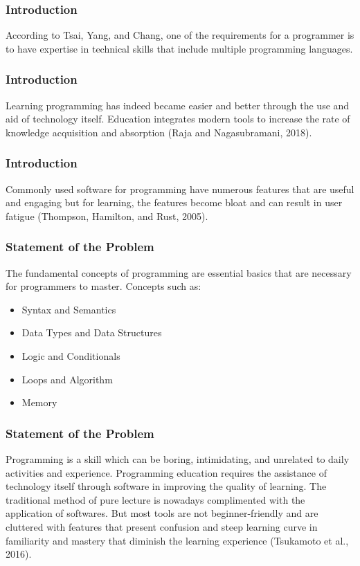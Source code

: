 \documentclass[handout]{beamer}
\newcommand{\parx}{
	\setlength{\parindent}{4em}
	\par}
\begin{document}
\begin{frame}
	\frametitle{Introduction}
	\justifying
	\parx
	According to Tsai, Yang, and Chang, one of the requirements for a programmer
	is to have expertise in technical skills that include multiple programming
	languages.
\end{frame}

\begin{frame}
	\frametitle{Introduction}
	\justifying
	\parx
	Learning programming has indeed became easier and better through the use and
	aid of technology itself. Education integrates modern tools to increase the
	rate of knowledge acquisition and absorption (Raja and Nagasubramani, 2018).
\end{frame}

\begin{frame}
	\frametitle{Introduction}
	\justifying
	\parx
	Commonly used software for programming have numerous features that are useful
	and engaging but for learning, the features become bloat and can result in
	user fatigue (Thompson, Hamilton, and Rust, 2005).
\end{frame}

\begin{frame}
	\frametitle{Statement of the Problem}
	\justifying
	\parx
	The fundamental concepts of programming are essential basics that are necessary
	for programmers to master. Concepts such as:

	\begin{itemize}
			\item<1-> Syntax and Semantics
			\item<2-> Data Types and Data Structures
			\item<3-> Logic and Conditionals
			\item<4-> Loops and Algorithm
			\item<5-> Memory
	\end{itemize}

\end{frame}

\begin{frame}
	\frametitle{Statement of the Problem}
	\justifying
	\parx
	Programming is a skill which can be boring, intimidating, and unrelated to
	daily activities and experience. Programming education requires the
	assistance of technology itself through software in improving the quality of
	learning. The traditional method of pure lecture is nowadays complimented
	with the application of softwares. But most tools are not beginner-friendly
	and are cluttered with features that present confusion and steep learning
	curve in familiarity and mastery that diminish the learning experience
	(Tsukamoto et al., 2016).
\end{frame}
\end{document}
